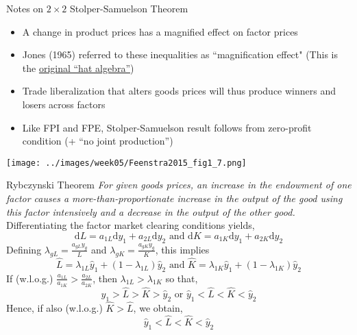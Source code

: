 \documentclass[11pt,notes=hide,aspectratio=169]{beamer}
\begin{document}
\begin{frame}{Notes on $2 \times 2$ Stolper-Samuelson Theorem}
\begin{itemize}
\item A change in product prices has a magnified effect on factor
prices
\item Jones (1965) referred to these inequalities as ``magnification
effect"
(This is the \href{https://tradediversion.net/2018/05/07/on-hat-algebra/}{original ``hat algebra''})
\item Trade liberalization that alters goods prices will thus produce winners and losers across factors
\item Like FPI and FPE, Stolper-Samuelson result follows from zero-profit condition (+ ``no joint production'')
\end{itemize}
\begin{center}
\texttt{[image: ../images/week05/Feenstra2015\_fig1\_7.png]}
\end{center}
\end{frame}
\begin{frame}{Rybczynski Theorem}
\textit{For given goods prices, an increase in the endowment of one factor
causes a more-than-proportionate increase in the output of the good using this factor intensively and
a decrease in the output of the other good.}
Differentiating the factor market clearing conditions yields,%
\begin{equation*}
\textrm{d}L=a_{1L}\textrm{d}y_{1}+a_{2L}\textrm{d}y_{2}\text{ and\ }\textrm{d}K=a_{1K}\textrm{d}y_{1}+a_{2K}\textrm{d}y_{2}
\end{equation*}
Defining $\lambda_{gL}=\frac{a_{gL}y_{g}}{L}$ and $\lambda_{gK}=\frac{a_{gK}y_{g}}{K}$, this implies
\begin{equation*}
\hat{L}=\lambda_{1L}\hat{y}_{1}+\left( 1-\lambda_{1L}\right) \hat{y}_{2}%
\text{ and }\hat{K}=\lambda_{1K}\hat{y}_{1}+\left( 1-\lambda_{1K}\right) 
\hat{y}_{2}
\end{equation*}
If (w.l.o.g.) $\frac{a_{1L}}{a_{1K}}>\frac{a_{2L}}{a_{2K}}$, then $\lambda
_{1L}>\lambda_{1K}$ so that,%
\begin{equation*}
\hat{y}_{1}>\hat{L}>\hat{K}>\hat{y}_{2}\text{ or }\hat{y}_{1}<\hat{L}<\hat{K}%
<\hat{y}_{2}
\end{equation*}
Hence, if also (w.l.o.g.) $\hat{K}>\hat{L}$, we obtain,%
\begin{equation*}
\hat{y}_{1}<\hat{L}<\hat{K}<\hat{y}_{2}
\end{equation*}
\end{frame}
\end{document}
